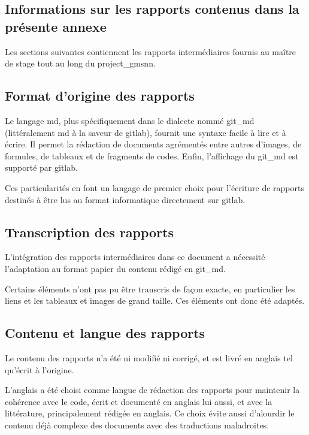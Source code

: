 
\begin{nohyphen}
\section{Informations sur les rapports contenus dans la présente annexe} \label{report_infos}
Les sections suivantes contiennent les rapports intermédiaires fournis au maître de stage tout au long du \gls{project_gmsnn}.

\subsection{Format d'origine des rapports}
Le langage \gls{md}, plus spécifiquement dans le dialecte nommé \gls{git_md} (littéralement \og \gls{md} à la saveur de \gls{gitlab}\fg{}), fournit une syntaxe facile à lire et à écrire. %
Il permet la rédaction de documents agrémentés entre autres d'images, de formules, de tableaux et de fragments de codes.
Enfin, l'affichage du \gls{git_md} est supporté par \gls{gitlab}. %

Ces particularités en font un langage de premier choix pour l'écriture de rapports destinés à être lus au format informatique directement sur \gls{gitlab}.

\subsection{Transcription des rapports}
L'intégration des rapports intermédiaires dans ce document a nécessité l'adaptation au format papier du contenu rédigé en \gls{git_md}.

Certains éléments n'ont pas pu être transcris de façon exacte, en particulier les liens et les tableaux et images de grand taille. Ces éléments ont donc été adaptés.

\subsection{Contenu et langue des rapports}
Le contenu des rapports n'a été ni modifié ni corrigé, et est livré en anglais tel qu'écrit à l'origine.

L'anglais a été choisi comme langue de rédaction des rapports pour maintenir la cohérence avec le code, écrit et documenté en anglais lui aussi, et avec la littérature, principalement rédigée en anglais.
Ce choix évite aussi d'alourdir le contenu déjà complexe des documents avec des traductions maladroites. %

\end{nohyphen}

